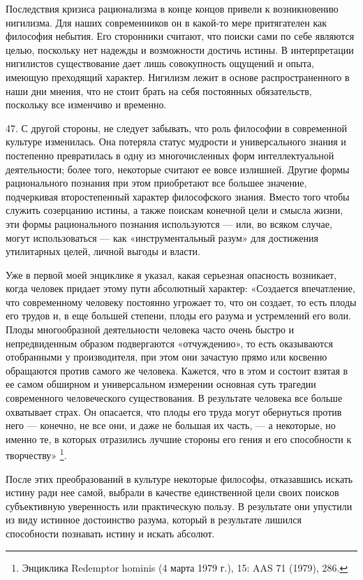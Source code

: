 \documentclass[a5paper,10pt]{article}
\begin{document}
Последствия кризиса рационализма в конце концов привели к возникновению
нигилизма. Для наших современников он в какой-то мере притягателен как
философия небытия. Его сторонники считают, что поиски сами по себе являются
целью, поскольку нет надежды и возможности достичь истины. В интерпретации
нигилистов существование дает лишь совокупность ощущений и опыта, имеющую
преходящий характер. Нигилизм лежит в основе распространенного в наши дни
мнения, что не стоит брать на себя постоянных обязательств, поскольку все
изменчиво и временно.

47. С другой стороны, не следует забывать, что роль философии в современной
культуре изменилась. Она потеряла статус мудрости и универсального знания и
постепенно превратилась в одну из многочисленных форм интеллектуальной
деятельности; более того, некоторые считают ее вовсе излишней. Другие формы
рационального познания при этом приобретают все большее значение, подчеркивая
второстепенный характер философского знания. Вместо того чтобы служить
созерцанию истины, а также поискам конечной цели и смысла жизни, эти формы
рационального познания используются — или, во всяком случае, могут
использоваться — как «инструментальный разум» для достижения утилитарных целей,
личной выгоды и власти.

Уже в первой моей энциклике я указал, какая серьезная опасность возникает,
когда человек придает этому пути абсолютный характер: «Создается впечатление,
что современному человеку постоянно угрожает то, что он создает, то есть плоды
его трудов и, в еще большей степени, плоды его разума и устремлений его воли.
Плоды многообразной деятельности человека часто очень быстро и непредвиденным
образом подвергаются «отчуждению», то есть оказываются отобранными у
производителя, при этом они зачастую прямо или косвенно обращаются против
самого же человека. Кажется, что в этом и состоит взятая в ее самом обширном и
универсальном измерении основная суть трагедии современного человеческого
существования. В результате человека все больше охватывает страх.  Он
опасается, что плоды его труда могут обернуться против него — конечно, не все
они, и даже не большая их часть, — а некоторые, но именно те, в которых
отразились лучшие стороны его гения и его способности к творчеству»
\footnote{Энциклика Redemptor hominis (4 марта 1979 г.), 15: AAS 71 (1979),
286.}.

После этих преобразований в культуре некоторые философы, отказавшись искать
истину ради нее самой, выбрали в качестве единственной цели своих поисков
субъективную уверенность или практическую пользу. В результате они упустили из
виду истинное достоинство разума, который в результате лишился способности
познавать истину и искать абсолют.
\end{document}
